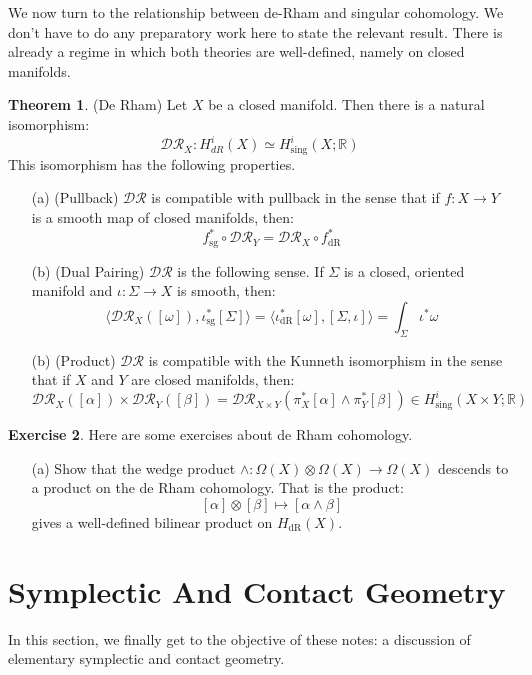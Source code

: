 \documentclass[12pt]{article}
\theoremstyle{definition}
\newtheorem{theorem}{Theorem}[section]
\newtheorem{exercise}[theorem]{Exercise}
\numberwithin{equation}{section}
\newcommand{\R}{{\mathbb R}}
\newcommand{\op}{\operatorname}
\begin{document}
We now turn to the relationship between de-Rham and singular cohomology. We don't have to do any preparatory work here to state the relevant result. There is already a regime in which both theories are well-defined, namely on closed manifolds. 

\begin{theorem} \label{thm:de_rham_and_sing} (De Rham) Let $X$ be a closed manifold. Then there is a natural isomorphism:
\[
\mathcal{DR}_X:H^i_{dR}(X) \simeq H^i_{\op{sing}}(X;\R)
\]
This isomorphism has the following properties.
\begin{itemize}
\item[(a)] (Pullback) $\mathcal{DR}$ is compatible with pullback in the sense that if $f:X \to Y$ is a smooth map of closed manifolds, then:
\[
f_{\op{sg}}^* \circ \mathcal{DR}_Y = \mathcal{DR}_X \circ f^*_{\op{dR}}
\]
\item[(b)] (Dual Pairing) $\mathcal{DR}$ is the following sense. If $\Sigma$ is a closed, oriented manifold and $\iota:\Sigma \to X$ is smooth, then:
\[
\langle \mathcal{DR}_X([\omega]),\iota^*_{\op{sg}}[\Sigma]\rangle = \langle \iota^*_{\op{dR}}[\omega],[\Sigma,\iota]\rangle = \int_\Sigma \iota^*\omega
\]
\item[(b)] (Product) $\mathcal{DR}$ is compatible with the Kunneth isomorphism in the sense that if $X$ and $Y$ are closed manifolds, then: 
\[
\mathcal{DR}_X([\alpha]) \times \mathcal{DR}_Y([\beta]) = \mathcal{DR}_{X \times Y}(\pi_X^*[\alpha] \wedge \pi_Y^*[\beta]) \in H^i_{\op{sing}}(X \times Y;\R)
\]
\end{itemize}
\end{theorem}

\begin{exercise} Here are some exercises about de Rham cohomology. 
\begin{itemize}
	\item[(a)] Show that the wedge product $\wedge:\Omega(X) \otimes \Omega(X) \to \Omega(X)$ descends to a product on the de Rham cohomology. That is the product:
	\[
	[\alpha] \otimes [\beta] \mapsto [\alpha \wedge \beta]
	\]
	gives a well-defined bilinear product on $H_{\op{dR}}(X)$.
\end{itemize}
\end{exercise} 

\section{Symplectic And Contact Geometry} \label{sec:symplectic_and_contact_manifolds} In this section, we finally get to the objective of these notes: a discussion of elementary symplectic and contact geometry. 
\end{document}
